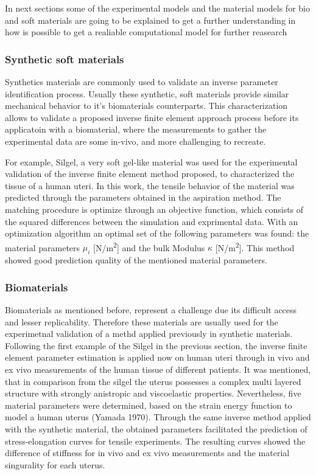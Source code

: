 In next sections some of the experimental models and the material models for bio and soft materials are 
going to be explained to get a further understanding in how is possible to get a realiable computational 
model for further reasearch

\subsubsection{Synthetic soft materials}

Synthetics materials are commonly used to validate an inverse parameter identification process. 
Usually these synthetic, soft materials provide similar mechanical behavior to it's biomaterials 
counterparts. This characterization allows to validate a proposed inverse finite element approach process
before its applicatoin with a biomaterial, where the measurements to gather the experimental data are 
some in-vivo, and more challenging to recreate.


For example, Silgel, a very soft gel-like material \cite{Kauer2002} was used for the experimental 
validation of the inverse finite element method proposed, to characterized the tissue of 
a human uteri. In this work, the tensile behavior of the material was predicted through the 
parameters obtained in the aspiration method. The matching procedure is optimize through 
an objective function, which consists of the squared differences between the simulation 
and exprimental data. With an optimization algorithm an optimal set of the following parameters 
was found: the material parameters \(\mu_i\) [N/m\textsuperscript{2}] and the bulk Modulus
\(\kappa\) [N/m\textsuperscript{2}]. This method showed good prediction quality of the mentioned 
material parameters.

\subsubsection{Biomaterials}
Biomaterials as mentioned before, represent a challenge due its difficult access and lesser replicability.
Therefore these materials are usually used for the experimetnal validation of a methd applied previously in 
synthetic materials. 
 Following the first example of the Silgel in the previous section, the inverse finite element parameter
 estimation is applied now on human uteri \cite{Kauer2002} through in vivo and ex vivo measurements of the human tissue of 
 different patients. It was mentioned, that in comparison from the silgel the uterus possesses a complex 
 multi layered structure with strongly anistropic and viscoelastic properties. Nevertheless, five 
 material parameters were determined, based on the strain energy function to model a human uterus (Yamada 1970).
Through the same inverse method applied with the synthetic material, the obtained parameters facilitated the prediction of stress-elongation curves for tensile experiments. The 
 resulting curves showed the difference of stiffness for in vivo and ex vivo measurements and the material 
 singurality for each uterus.



